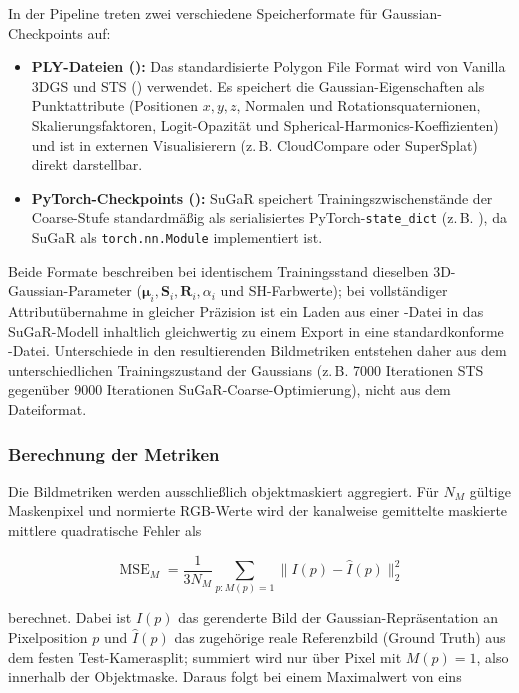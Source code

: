 In der Pipeline treten zwei verschiedene Speicherformate für Gaussian-Checkpoints
auf:
\begin{itemize}
  \item \textbf{PLY-Dateien ():} Das standardisierte Polygon File
        Format wird von Vanilla 3DGS und STS () verwendet. Es
        speichert die Gaussian-Eigenschaften als Punktattribute (Positionen $x,y,z$,
        Normalen und Rotationsquaternionen, Skalierungsfaktoren, Logit-Opazität und
        Spherical-Harmonics-Koeffizienten) und ist in externen Visualisierern (z.\,B.
        CloudCompare oder SuperSplat) direkt darstellbar.
  \item \textbf{PyTorch-Checkpoints ():} SuGaR speichert
        Trainingszwischenstände der Coarse-Stufe standardmäßig als serialisiertes
        PyTorch-\texttt{state\_dict} (z.\,B. ), da SuGaR als
        \texttt{torch.nn.Module} implementiert ist.
\end{itemize}

Beide Formate beschreiben bei identischem Trainingsstand dieselben
3D-Gaussian-Parameter ($\boldsymbol{\mu}_i, \mathbf{S}_i, \mathbf{R}_i,
\alpha_i$ und SH-Farbwerte); bei vollständiger Attributübernahme in gleicher
Präzision ist ein Laden aus einer -Datei in das SuGaR-Modell
inhaltlich gleichwertig zu einem Export in eine standardkonforme
-Datei. Unterschiede in den resultierenden Bildmetriken entstehen
daher aus dem unterschiedlichen Trainingszustand der Gaussians (z.\,B. 7000
Iterationen STS gegenüber 9000 Iterationen SuGaR-Coarse-Optimierung), nicht
aus dem Dateiformat.

\subsubsection*{Berechnung der Metriken}

Die Bildmetriken werden ausschließlich objektmaskiert aggregiert. Für $N_M$ gültige
Maskenpixel und normierte RGB-Werte wird der kanalweise gemittelte maskierte
mittlere quadratische Fehler als

\begin{equation}
	\operatorname{MSE}_M=
	\frac{1}{3N_M}\sum_{p:M(p)=1}\lVert I(p)-\hat I(p)\rVert_2^2
	\label{eq:masked-mse}
\end{equation}

berechnet. Dabei ist $I(p)$ das gerenderte Bild der Gaussian-Repräsentation an
Pixelposition $p$ und $\hat I(p)$ das zugehörige reale Referenzbild (Ground
Truth) aus dem festen Test-Kamerasplit; summiert wird nur über Pixel mit
$M(p)=1$, also innerhalb der Objektmaske. Daraus folgt bei einem Maximalwert
von eins

